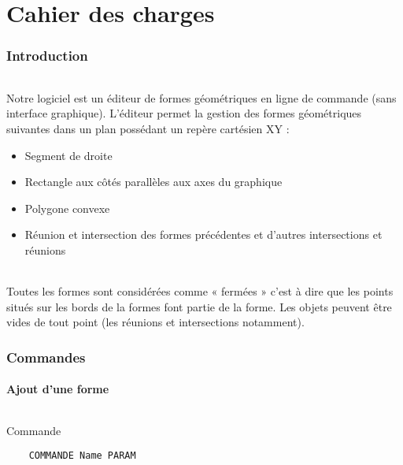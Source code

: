 


\part{Cahier des charges}

\section{Introduction}

\paragraph{}
Notre logiciel est un éditeur de formes géométriques en ligne de commande (sans interface graphique). L'éditeur permet la gestion des formes géométriques suivantes dans un plan possédant un repère cartésien XY :

\begin{itemize}
	\item Segment de droite
	\item Rectangle aux côtés parallèles aux axes du graphique
	\item Polygone convexe
	\item Réunion et intersection des formes précédentes et d'autres intersections et réunions
\end{itemize}

\paragraph{}
Toutes les formes sont considérées comme « fermées » c'est à dire que les points situés sur les bords de la formes font partie de la forme. Les objets peuvent être vides de tout point (les réunions et intersections notamment).

\section{Commandes}

\subsection{Ajout d'une forme}
 \paragraph{}
Commande
\begin{lstlisting}
	COMMANDE Name PARAM
\end{lstlisting}
